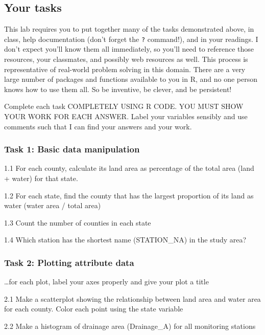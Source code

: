 \documentclass[]{article}
\begin{document}
\hypertarget{your-tasks}{%
\subsection{Your tasks}\label{your-tasks}}

This lab requires you to put together many of the tasks demonstrated
above, in class, help documentation (don't forget the \texttt{?}
command!), and in your readings. I don't expect you'll know them all
immediately, so you'll need to reference those resources, your
classmates, and possibly web resources as well. This process is
representative of real-world problem solving in this domain. There are a
very large number of packages and functions available to you in R, and
no one person knows how to use them all. So be inventive, be clever, and
be persistent!

Complete each task COMPLETELY USING R CODE. YOU MUST SHOW YOUR WORK FOR
EACH ANSWER. Label your variables sensibly and use comments such that I
can find your answers and your work.

\hypertarget{task-1-basic-data-manipulation}{%
\subsubsection{Task 1: Basic data
manipulation}\label{task-1-basic-data-manipulation}}

1.1 For each county, calculate its land area as percentage of the total
area (land + water) for that state.

1.2 For each state, find the county that has the largest proportion of
its land as water (water area / total area)

1.3 Count the number of counties in each state

1.4 Which station has the shortest name (STATION\_NA) in the study area?

\hypertarget{task-2-plotting-attribute-data}{%
\subsubsection{Task 2: Plotting attribute
data}\label{task-2-plotting-attribute-data}}

\ldots for each plot, label your axes properly and give your plot a
title

2.1 Make a scatterplot showing the relationship between land area and
water area for each county. Color each point using the state variable

2.2 Make a histogram of drainage area (Drainage\_A) for all monitoring
stations
\end{document}
